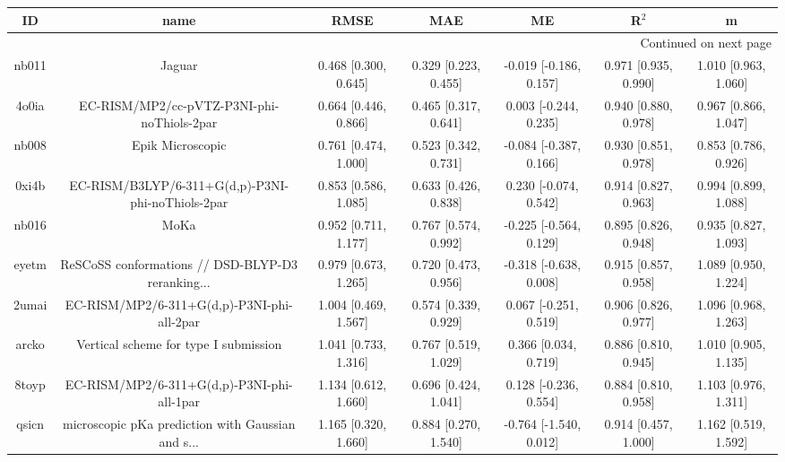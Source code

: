 \documentclass{article}
\begin{document}
\begin{center}
\begin{longtable}{|ccccccc|}
\toprule
    ID &                                               name &                  RMSE &                   MAE &                      ME &                 R$^2$ &                     m \\
\midrule
\endhead
\midrule
\multicolumn{7}{r}{{Continued on next page}} \\
\midrule
\endfoot

\bottomrule
\endlastfoot
 nb011 &                                             Jaguar &  0.468 [0.300, 0.645] &  0.329 [0.223, 0.455] &  -0.019 [-0.186, 0.157] &  0.971 [0.935, 0.990] &  1.010 [0.963, 1.060] \\
 4o0ia &         EC-RISM/MP2/cc-pVTZ-P3NI-phi-noThiols-2par &  0.664 [0.446, 0.866] &  0.465 [0.317, 0.641] &   0.003 [-0.244, 0.235] &  0.940 [0.880, 0.978] &  0.967 [0.866, 1.047] \\
 nb008 &                                   Epik Microscopic &  0.761 [0.474, 1.000] &  0.523 [0.342, 0.731] &  -0.084 [-0.387, 0.166] &  0.930 [0.851, 0.978] &  0.853 [0.786, 0.926] \\
 0xi4b &  EC-RISM/B3LYP/6-311+G(d,p)-P3NI-phi-noThiols-2par &  0.853 [0.586, 1.085] &  0.633 [0.426, 0.838] &   0.230 [-0.074, 0.542] &  0.914 [0.827, 0.963] &  0.994 [0.899, 1.088] \\
 nb016 &                                               MoKa &  0.952 [0.711, 1.177] &  0.767 [0.574, 0.992] &  -0.225 [-0.564, 0.129] &  0.895 [0.826, 0.948] &  0.935 [0.827, 1.093] \\
 eyetm &  ReSCoSS conformations // DSD-BLYP-D3 reranking... &  0.979 [0.673, 1.265] &  0.720 [0.473, 0.956] &  -0.318 [-0.638, 0.008] &  0.915 [0.857, 0.958] &  1.089 [0.950, 1.224] \\
 2umai &         EC-RISM/MP2/6-311+G(d,p)-P3NI-phi-all-2par &  1.004 [0.469, 1.567] &  0.574 [0.339, 0.929] &   0.067 [-0.251, 0.519] &  0.906 [0.826, 0.977] &  1.096 [0.968, 1.263] \\
 arcko &              Vertical scheme for type I submission &  1.041 [0.733, 1.316] &  0.767 [0.519, 1.029] &    0.366 [0.034, 0.719] &  0.886 [0.810, 0.945] &  1.010 [0.905, 1.135] \\
 8toyp &         EC-RISM/MP2/6-311+G(d,p)-P3NI-phi-all-1par &  1.134 [0.612, 1.660] &  0.696 [0.424, 1.041] &   0.128 [-0.236, 0.554] &  0.884 [0.810, 0.958] &  1.103 [0.976, 1.311] \\
 qsicn &  microscopic pKa prediction with Gaussian and s... &  1.165 [0.320, 1.660] &  0.884 [0.270, 1.540] &  -0.764 [-1.540, 0.012] &  0.914 [0.457, 1.000] &  1.162 [0.519, 1.592] \\

\end{longtable}
\end{center}
\end{document}
